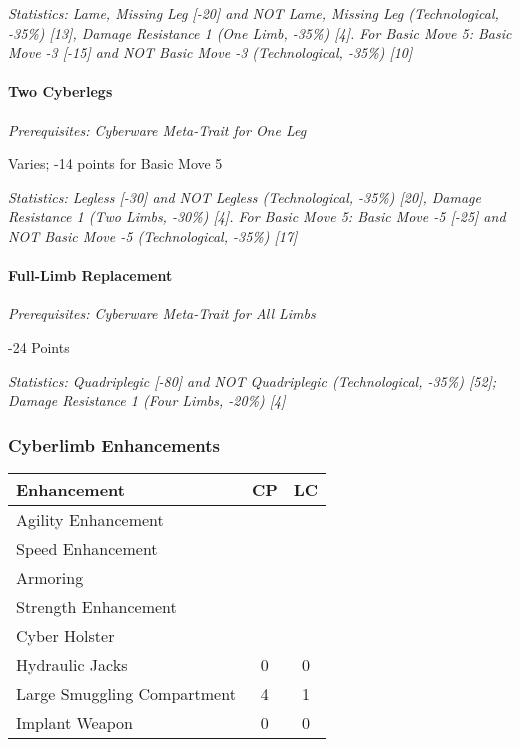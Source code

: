 \begin{multicols*}{3}
	\textit{\textcolor{OliveGreen}{Statistics:  Lame, Missing Leg [-20] and NOT Lame, Missing Leg (Technological, -35\%) [13], Damage Resistance 1 (One Limb, -35\%) [4]. For Basic Move 5: Basic Move -3 [-15] and NOT Basic Move -3 (Technological, -35\%) [10]}}
	
	
	\paragraph{Two Cyberlegs}
	\textit{Prerequisites:  Cyberware Meta-Trait for One Leg}
	\begin{flushright}
		Varies; -14 points for Basic Move 5
	\end{flushright}
	
	\textit{\textcolor{OliveGreen}{Statistics:  Legless [-30] and NOT Legless (Technological, -35\%) [20], Damage Resistance 1 (Two Limbs, -30\%) [4]. For Basic Move 5: Basic Move -5 [-25] and NOT Basic Move -5 (Technological, -35\%) [17]}}
	
	\paragraph{Full-Limb Replacement}
	\textit{Prerequisites:  Cyberware Meta-Trait for All Limbs}
	\begin{flushright}
		-24 Points
	\end{flushright}
	
	\textit{\textcolor{OliveGreen}{Statistics: Quadriplegic [-80] and NOT Quadriplegic (Technological, -35\%) [52]; Damage Resistance 1 (Four Limbs, -20\%) [4]}}
		
	\subsubsection{Cyberlimb Enhancements}
	
	\begin{center}
		\begin{tabularx}{0.32\textwidth}{|X|c|c|}
			\hline
			Enhancement & CP & LC\\
			\hline
			\hline
			Agility Enhancement & & \\
			Speed Enhancement & & \\
			Armoring & & \\
			Strength Enhancement & & \\
			Cyber Holster & & \\
			Hydraulic Jacks & 0 & 0\\
			Large Smuggling Compartment & 4 & 1\\
			Implant Weapon & 0 & 0\\
			\hline
		\end{tabularx}
	\end{center}
	

\end{multicols*}
